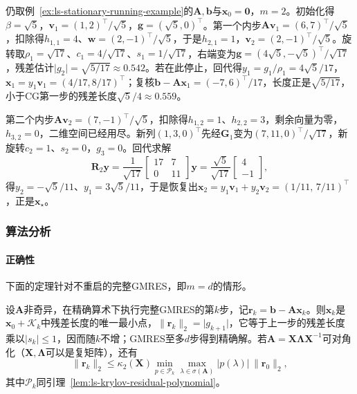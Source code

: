 \begin{example}[GMRES在贯穿例上的两步]
\label{ex:ls-gmres-two-steps}
仍取例~\ref{ex:ls-stationary-running-example}的$\bm A,\bm b$与$\bm x_0=\bm 0$，$m=2$。初始化得$\beta=\sqrt5$，$\bm v_1=(1,2)^\top/\sqrt5$，$\bm g=(\sqrt5,0)^\top$。第一个内步$\bm A\bm v_1=(6,7)^\top/\sqrt5$，扣除得$h_{1,1}=4$、$\bm w=(2,-1)^\top/\sqrt5$，于是$h_{2,1}=1$，$\bm v_2=(2,-1)^\top/\sqrt5$。旋转取$\rho_1=\sqrt{17}$、$c_1=4/\sqrt{17}$、$s_1=1/\sqrt{17}$，右端变为$\bm g=(4\sqrt5,-\sqrt5)^\top/\sqrt{17}$，残差估计$\lvert g_2\rvert=\sqrt{5/17}\approx0.542$。若在此停止，回代得$y_1=g_1/\rho_1=4\sqrt5/17$，$\bm x_1=y_1\bm v_1=(4/17,8/17)^\top$；复核$\bm b-\bm A\bm x_1=(-7,6)^\top/17$，长度正是$\sqrt{5/17}$，小于CG第一步的残差长度$\sqrt5/4\approx0.559$。

第二个内步$\bm A\bm v_2=(7,-1)^\top/\sqrt5$，扣除得$h_{1,2}=1$、$h_{2,2}=3$，剩余向量为零，$h_{3,2}=0$，二维空间已经用尽。新列$(1,3,0)^\top$先经$\bm G_1$变为$(7,11,0)^\top/\sqrt{17}$，新旋转$c_2=1$、$s_2=0$，$g_3=0$。回代求解
\[
 \bm R_2\bm y=\frac1{\sqrt{17}}\begin{bmatrix}17&7\\0&11\end{bmatrix}\bm y
 =\frac{\sqrt5}{\sqrt{17}}\begin{bmatrix}4\\-1\end{bmatrix},
\]
得$y_2=-\sqrt5/11$、$y_1=3\sqrt5/11$，于是恢复出$\bm x_2=y_1\bm v_1+y_2\bm v_2=(1/11,\,7/11)^\top$，正是$\bm x_\star$。
\end{example}

\subsubsection{算法分析}

\paragraph{正确性}
下面的定理针对不重启的完整GMRES，即$m=d$的情形。

\begin{theorem}[GMRES的最小残差性]
\label{thm:ls-gmres-optimality}
设$\bm A$非奇异，在精确算术下执行完整GMRES的第$k$步，记$\bm r_k=\bm b-\bm A\bm x_k$。则$\bm x_k$是$\bm x_0+\mathcal K_k$中残差长度的唯一最小点，$\lVert\bm r_k\rVert_2=\lvert g_{k+1}\rvert$，它等于上一步的残差长度乘以$\lvert s_k\rvert\le1$，因而随$k$不增；GMRES至多$d$步得到精确解。若$\bm A=\bm X\bm\Lambda\bm X^{-1}$可对角化（$\bm X,\bm\Lambda$可以是复矩阵），还有
\[
 \lVert\bm r_k\rVert_2\le\kappa_2(\bm X)\min_{p\in\mathcal P_k}\max_{\lambda\in\sigma(\bm A)}\lvert p(\lambda)\rvert\,\lVert\bm r_0\rVert_2,
\]
其中$\mathcal P_k$同引理~\ref{lem:ls-krylov-residual-polynomial}。
\end{theorem}

